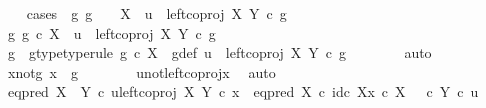 \begin{isabellebody}
\ \ \isamarkupfalse%
\ {\isacharparenleft}{\kern0pt}cases\ {\isachardoublequoteopen}{\isasymexists}\ g{\isachardot}{\kern0pt}\ g\ {\isacharcolon}{\kern0pt}\ {\isasymone}\ {\isasymrightarrow}\ X\ {\isasymand}\ u\ {\isacharequal}{\kern0pt}\ left{\isacharunderscore}{\kern0pt}coproj\ X\ Y\ {\isasymcirc}\isactrlsub c\ g{\isachardoublequoteclose}{\isacharparenright}{\kern0pt}\ \ \isanewline
\ \ \ \ \isamarkupfalse%
\ {\isachardoublequoteopen}{\isasymexists}g{\isachardot}{\kern0pt}\ g\ {\isasymin}\isactrlsub c\ X\ {\isasymand}\ u\ {\isacharequal}{\kern0pt}\ left{\isacharunderscore}{\kern0pt}coproj\ X\ Y\ {\isasymcirc}\isactrlsub c\ g{\isachardoublequoteclose}\isanewline
\ \ \ \ \isamarkupfalse%
\ \isamarkupfalse%
\ g\ \ g{\isacharunderscore}{\kern0pt}type{\isacharbrackleft}{\kern0pt}type{\isacharunderscore}{\kern0pt}rule{\isacharbrackright}{\kern0pt}{\isacharcolon}{\kern0pt}\ {\isachardoublequoteopen}g\ {\isasymin}\isactrlsub c\ X{\isachardoublequoteclose}\ \ g{\isacharunderscore}{\kern0pt}def{\isacharcolon}{\kern0pt}\ {\isachardoublequoteopen}u\ {\isacharequal}{\kern0pt}\ left{\isacharunderscore}{\kern0pt}coproj\ X\ Y\ {\isasymcirc}\isactrlsub c\ g{\isachardoublequoteclose}\isanewline
\ \ \ \ \ \ \isamarkupfalse%
\ auto\isanewline
\ \ \ \ \isamarkupfalse%
\ \isamarkupfalse%
\ x{\isacharunderscore}{\kern0pt}not{\isacharunderscore}{\kern0pt}g{\isacharcolon}{\kern0pt}\ {\isachardoublequoteopen}x\ {\isasymnoteq}\ g{\isachardoublequoteclose}\isanewline
\ \ \ \ \ \ \isamarkupfalse%
\ u{\isacharunderscore}{\kern0pt}not{\isacharunderscore}{\kern0pt}left{\isacharunderscore}{\kern0pt}coproj{\isacharunderscore}{\kern0pt}x\ \isamarkupfalse%
\ auto\isanewline
\ \ \ \ \isamarkupfalse%
\ {\isachardoublequoteopen}eq{\isacharunderscore}{\kern0pt}pred\ {\isacharparenleft}{\kern0pt}X\ {\isasymCoprod}\ Y{\isacharparenright}{\kern0pt}\ {\isasymcirc}\isactrlsub c\ {\isasymlangle}u{\isacharcomma}{\kern0pt}left{\isacharunderscore}{\kern0pt}coproj\ X\ Y\ {\isasymcirc}\isactrlsub c\ x{\isasymrangle}\ {\isacharequal}{\kern0pt}\ {\isacharparenleft}{\kern0pt}eq{\isacharunderscore}{\kern0pt}pred\ X\ {\isasymcirc}\isactrlsub c\ {\isasymlangle}id\isactrlsub c\ X{\isacharcomma}{\kern0pt}x\ {\isasymcirc}\isactrlsub c\ {\isasymbeta}\isactrlbsub X\isactrlesub {\isasymrangle}{\isacharparenright}{\kern0pt}\ {\isasymamalg}\ {\isacharparenleft}{\kern0pt}{\isasymf}\ {\isasymcirc}\isactrlsub c\ {\isasymbeta}\isactrlbsub Y\isactrlesub {\isacharparenright}{\kern0pt}\ {\isasymcirc}\isactrlsub c\ u{\isachardoublequoteclose}\isanewline

\end{isabellebody}
